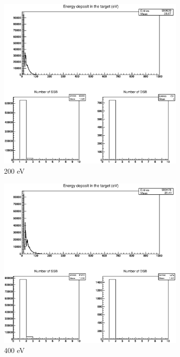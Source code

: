 \begin{figure}
\centering
\begin{subfigure}{.5\textwidth}
  \centering
  \includegraphics[width=.78\linewidth]{./Figures/1fzxp200ev.eps}
  \caption{200 eV}
  \label{fig:subi1}
\end{subfigure}%
\begin{subfigure}{.5\textwidth}
  \centering
  \includegraphics[width=.78\linewidth]{./Figures/1fzxp400ev.eps}
  \caption{400 eV}
  \label{fig:subi2}
\end{subfigure}
\begin{subfigure}{.5\textwidth}
  \centering

\end{subfigure}
\end{figure}
